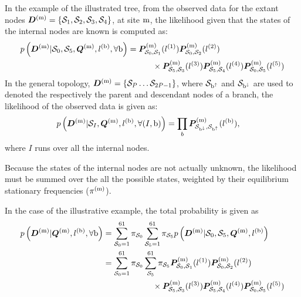 In the example of the illustrated tree, from the observed data for the extant nodes $\bm{D}^{(\text{m})} = \{ \mathcal{S}_1,\mathcal{S}_2, \mathcal{S}_3, \mathcal{S}_4 \}$, at site $\text{m}$, the \gls{likelihood} given that the states of the internal nodes are known is computed as:
\begin{align}
	p\left(\bm{D}^{(\text{m})}| \mathcal{S}_0, \mathcal{S}_5, \bm{Q}^{(\text{m})}, l^{(\text{b})}, \forall \text{b} \right) & = \bm{P}^{(\text{m})}_{\mathcal{S}_0, \mathcal{S}_1}(l^{(1)})
	\bm{P}^{(\text{m})}_{\mathcal{S}_0, \mathcal{S}_2}(l^{(2)}) \\
	& \quad \quad \quad
	\times \bm{P}^{(\text{m})}_{\mathcal{S}_5, \mathcal{S}_3}(l^{(3)})
	\bm{P}^{(\text{m})}_{\mathcal{S}_5, \mathcal{S}_4}(l^{(4)})
	\bm{P}^{(\text{m})}_{\mathcal{S}_0, \mathcal{S}_5}(l^{(5)}) \notag
\end{align}
In the general topology, $\bm{D}^{(\text{m})} = \{ \mathcal{S}_P \hdots \mathcal{S}_{2P-1} \}$, where $\mathcal{S}_{\text{b}^{\uparrow}}$ and $\mathcal{S}_{\text{b}^{\downarrow}}$ are used to denoted the respectively the parent and descendant nodes of a branch, the \gls{likelihood} of the observed data is given as:
\begin{align}
p\left(\bm{D}^{(\text{m})}| \mathcal{S}_{I}, \bm{Q}^{(\text{m})}, l^{(\text{b})}, \forall (I, \text{b}) \right) & = \prod_{b} \bm{P}^{(\text{m})}_{\mathcal{S}_{\text{b}^{\downarrow}}, \mathcal{S}_{\text{b}^{\uparrow}}}(l^{(\text{b})}),
\end{align}
where $I$ runs over all the internal nodes.

Because the states of the internal nodes are not actually unknown, the \gls{likelihood} must be summed over the all the possible states, weighted by their equilibrium stationary frequencies ($\pi^{(\text{m})}$).

In the case of the illustrative example, the total probability is given as
\begin{align}
	p\left(\bm{D}^{(\text{m})}| \bm{Q}^{(\text{m})}, l^{(\text{b})} , \forall \text{b} \right) & = \sum\limits_{\mathcal{S}_0=1}^{61} \pi_{\mathcal{S}_0} \sum\limits_{\mathcal{S}_5=1}^{61} \pi_{\mathcal{S}_5} p\left(\bm{D}^{(\text{m})}| \mathcal{S}_0, \mathcal{S}_5, \bm{Q}^{(\text{m})}, l^{(\text{b})} \right) \\
	& = \sum\limits_{\mathcal{S}_0=1}^{61} \pi_{\mathcal{S}_0} \sum\limits_{\mathcal{S}_5}^{61} \pi_{\mathcal{S}_5} \bm{P}^{(\text{m})}_{\mathcal{S}_0, \mathcal{S}_1}(l^{(1)})
	\bm{P}^{(\text{m})}_{\mathcal{S}_0, \mathcal{S}_2}(l^{(2)}) \\
	& \qquad \qquad \qquad
	\times \bm{P}^{(\text{m})}_{\mathcal{S}_5, \mathcal{S}_3}(l^{(3)})
	\bm{P}^{(\text{m})}_{\mathcal{S}_5, \mathcal{S}_4}(l^{(4)})
	\bm{P}^{(\text{m})}_{\mathcal{S}_0, \mathcal{S}_5}(l^{(5)})\notag
\end{align}

